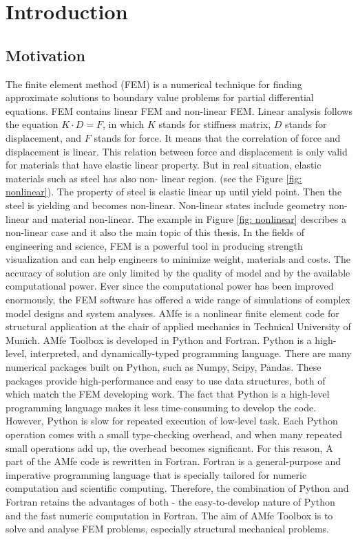 \chapter{Introduction}



\section{Motivation} \label{sec:Einl:Motivation}
The finite element method (FEM) is a numerical technique for finding approximate solutions to boundary value problems for partial differential equations. FEM contains linear FEM and non-linear FEM. 
Linear analysis follows the equation $K\cdot D = F$, in which $K$ stands for stiffness matrix, $D$ stands for  displacement, and $F$ stands for force. It means that the correlation of force and displacement is linear. This relation between force and displacement is only valid for materials that have elastic linear property. But in real situation, elastic materials such as steel has also non- linear region. (see the Figure \ref{fig: nonlinear}). The property of steel is elastic linear up until yield point. Then the steel is yielding and becomes non-linear. Non-linear states include geometry non-linear and material non-linear. The example in Figure \ref{fig: nonlinear} describes a non-linear case and it also the main topic of this thesis. In the fields of engineering and science, FEM is a powerful tool in producing strength visualization and can help engineers to minimize weight, materials and costs. The accuracy of solution are only limited by the quality of model and by the available computational power.  Ever since the computational power has been improved enormously, the FEM software has offered a wide range of simulations of complex model designs and system analyses.  \newline
AMfe is a nonlinear finite element code for structural application at the chair of applied mechanics in Technical University of Munich. AMfe Toolbox is developed in Python and Fortran. Python is a high-level, interpreted, and dynamically-typed programming language.  There are many numerical packages built on Python, such as Numpy, Scipy, Pandas. These packages provide high-performance and easy to use data structures, both of which match the FEM developing work. The fact that Python is a high-level programming language makes it less time-consuming to develop the code. However, Python is slow for repeated execution of low-level task. Each Python operation comes with a small type-checking overhead, and when many repeated small operations add up, the overhead becomes significant. For this reason, A part of the AMfe code is rewritten in Fortran. Fortran is a general-purpose and imperative programming language that is specially tailored for numeric computation and scientific computing. Therefore, the combination of Python and Fortran retains the advantages of both - the easy-to-develop nature of Python and the fast numeric computation in Fortran. The aim of AMfe Toolbox is to solve and analyse FEM problems, especially structural mechanical problems.
